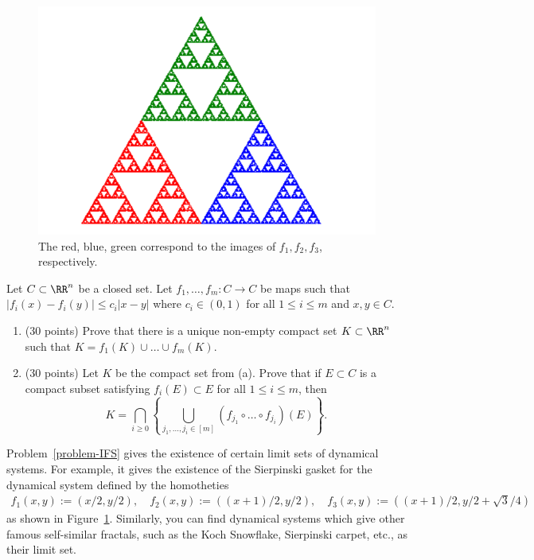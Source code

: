 \documentclass[11pt]{article}
\begin{document}
\begin{figure}[h]
\begin{center}
    \includegraphics[scale = 0.4]{../images/image6.png}
    \caption{The red, blue, green correspond to the images of $f_1, f_2, f_3$, respectively.}
    \label{sierpinski}
\end{center}
\end{figure}

\begin{prob} \label{problem-IFS}
    Let $C \subset \RR^n$ be a closed set. Let $f_1, \ldots, f_m : C \to C$ be maps such that $|f_i(x) - f_i(y)| \leq c_i |x-y|$ where $c_i \in (0, 1)$ for all $1 \leq i \leq m$ and $x, y \in C$. 
    \begin{enumerate}[label = (\alph*)]
        \item (30 points) Prove that there is a unique non-empty compact set $K \subset \RR^n$ such that $K = f_1(K) \cup \ldots \cup f_m(K)$. 
        \item (30 points) Let $K$ be the compact set from (a). Prove that if $E \subset C$ is a compact subset satisfying $f_i(E) \subset E$ for all $1 \leq i \leq m$, then 
        \[
            K = \bigcap_{i \geq 0} \left \{ \bigcup_{j_1, \ldots, j_i \in [m]} (f_{j_1} \circ \ldots \circ f_{j_i})(E) \right \}.
        \]
    \end{enumerate}
\end{prob}

Problem~\ref{problem-IFS} gives the existence of certain limit sets of dynamical systems. For example, it gives the existence of the Sierpinski gasket for the dynamical system defined by the homotheties
    \begin{align*}
        f_1(x, y):= \left ( x/2, y/2 \right ), \quad f_2(x, y):= \left ( (x+1)/2, y/2 \right ), \quad f_3(x, y) := \left ( (x+1)/2, y/2 + \sqrt{3}/4 \right ) 
    \end{align*}
    as shown in Figure~\ref{sierpinski}. Similarly, you can find dynamical systems which give other famous self-similar fractals, such as the Koch Snowflake, Sierpinski carpet, etc., as their limit set.
\end{document}
